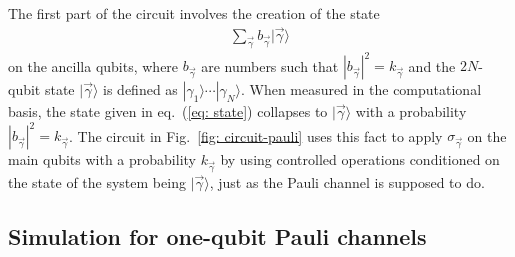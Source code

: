 \documentclass[10pt,letterpaper]{article} %
\newcommand{\fref}[1]{Fig.~\ref{#1}}
\newcommand{\eref}[1]{eq.~(\ref{#1})}
\begin{document}
The first part of the circuit involves the creation of the state
\begin{eqnarray}
\label{eq: state}
\sum_{\vec{\gamma}} b_{\vec{\gamma}} |\vec{\gamma} \rangle
\end{eqnarray}
on the ancilla qubits, where $b_{\vec{\gamma}}$ are numbers such that $
|b_{\vec{\gamma}}|^2 = k_{\vec{\gamma}}$ and
the $2N$-qubit state $|\vec{\gamma}\rangle$ is defined as $|\gamma_1\rangle
\cdots |\gamma_N\rangle$.
When measured in the computational basis, the state given in \eref{eq: state}
collapses to $|\vec{\gamma}\rangle$ with a 
probability $|b_{\vec{\gamma}}|^2 = k_{\vec\gamma}$. 
The circuit in \fref{fig: circuit-pauli} uses this fact
to apply $\sigma_{\vec{\gamma}}$ on the main qubits
with a probability $k_{\vec\gamma}$ by using controlled operations 
conditioned on the state of the system being $|\vec{\gamma}\rangle$,
just as the Pauli channel is supposed to do.  
% 
% 

 


\subsection{Simulation for one-qubit Pauli channels} %
\label{subsec: Simulation for one-qubit Pauli channels}


\end{document}
